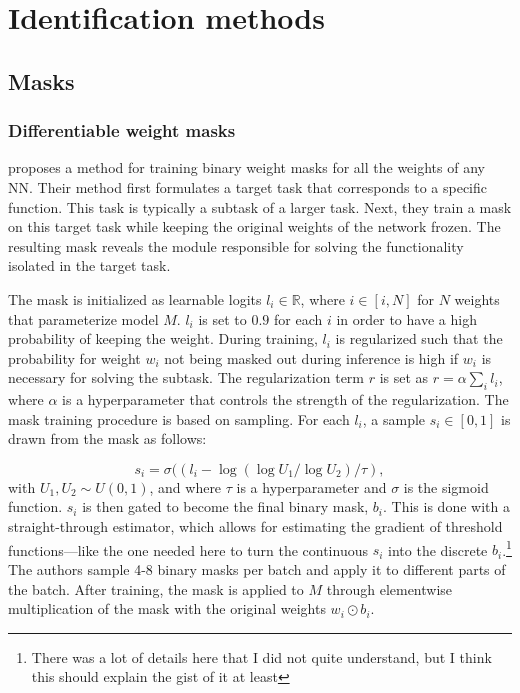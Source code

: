 \documentclass[11pt]{article}
\begin{document}
\section{Identification methods}
\subsection{Masks}
\subsubsection{Differentiable weight masks}
\citet{csordas2020neural} proposes a method for training binary weight masks for all the weights of any NN. Their method first formulates a target task that corresponds to a specific function. This task is typically a subtask of a larger task. Next, they train a mask on this target task while keeping the original weights of the network frozen. The resulting mask reveals the module responsible for solving the functionality isolated in the target task.

The mask is initialized as learnable logits $l_i \in \mathbb{R}$, where $i \in [i, N]$ for $N$ weights that parameterize model $M$. $l_i$ is set to $0.9$ for each $i$ in order to have a high probability of keeping the weight. During training, $l_i$ is regularized such that the probability for weight $w_i$ not being masked out during inference is high if $w_i$ is necessary for solving the subtask. The regularization term $r$ is set as $r = \alpha \sum_i l_i$, where $\alpha$ is a hyperparameter that controls the strength of the regularization. The mask training procedure is based on sampling. For each $l_i$, a sample $s_i \in [0, 1]$ is drawn from the mask as follows:

\begin{equation}
s_i = \sigma((l_i - \log(\log U_1 / \log U_2) / \tau),
\end{equation}
with $U_1, U_2 \sim U(0,1)$, and where $\tau$ is a hyperparameter and $\sigma$ is the sigmoid function. $s_i$ is then gated to become the final binary mask, $b_i$. This is done with a straight-through estimator, which allows for estimating the gradient of threshold functions---like the one needed here to turn the continuous $s_i$ into the discrete $b_i$.\footnote{There was a lot of details here that I did not quite understand, but I think this should explain the gist of it at least} The authors sample 4-8 binary masks per batch and apply it to different parts of the batch. After training, the mask is applied to $M$ through elementwise multiplication of the mask with the original weights $w_i \odot b_i$. 
\end{document}
